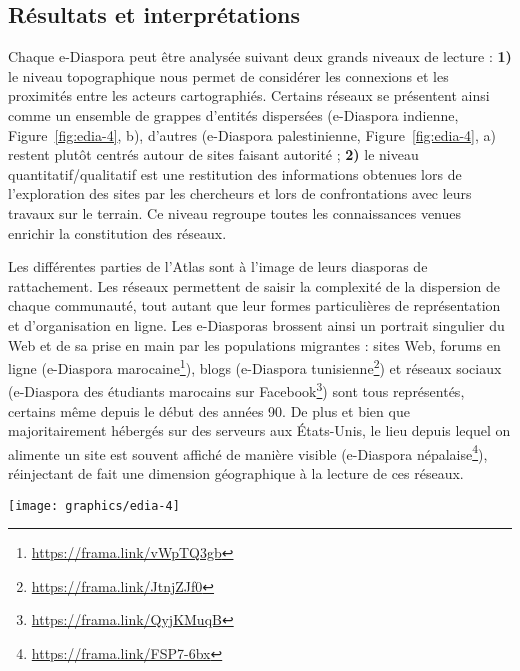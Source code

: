 \documentclass[symmetric,justified,marginals=raggedouter]{tufte-book}
\begin{document}
\subsection{Résultats et interprétations}

\noindent Chaque e-Diaspora peut être analysée suivant deux grands niveaux de lecture : \textbf{1)} le niveau topographique nous permet de considérer les connexions et les proximités entre les acteurs cartographiés. Certains réseaux se présentent ainsi comme un ensemble de grappes d'entités dispersées (e-Diaspora indienne, Figure~\ref{fig:edia-4}, b), d'autres (e-Diaspora palestinienne, Figure~\ref{fig:edia-4}, a) restent plutôt centrés autour de sites faisant autorité \citep{ben-david_palestinian_2012}; \textbf{2)} le niveau quantitatif/qualitatif est une restitution des informations obtenues lors de l'exploration des sites par les chercheurs et lors de confrontations avec leurs travaux sur le terrain. Ce niveau regroupe toutes les connaissances venues enrichir la constitution des réseaux.

Les différentes parties de l'Atlas sont à l'image de leurs diasporas de rattachement. Les réseaux permettent de saisir la complexité de la dispersion de chaque communauté, tout autant que leur formes particulières de représentation et d'organisation en ligne. Les e-Diasporas brossent ainsi un portrait singulier du Web et de sa prise en main par les populations migrantes : sites Web, forums en ligne (e-Diaspora marocaine\footnote{\RaggedOuter \url{https://frama.link/vWpTQ3gb}}), blogs (e-Diaspora tunisienne\footnote{\RaggedOuter \url{https://frama.link/JtnjZJf0}}) et réseaux sociaux (e-Diaspora des étudiants marocains sur Facebook\footnote{\RaggedOuter \url{https://frama.link/QyjKMuqB}}) sont tous représentés, certains même depuis le début des années 90. De plus et bien que majoritairement hébergés sur des serveurs aux États-Unis, le lieu depuis lequel on alimente un site est souvent affiché de manière visible (e-Diaspora népalaise\footnote{\RaggedOuter \url{https://frama.link/FSP7-6bx}}), réinjectant de fait une dimension géographique à la lecture de ces réseaux.

\begin{figure*}
  \texttt{[image: graphics/edia-4]}
  \caption{L'e-Diaspora palestinienne (a, par A. Ben-David) et l'e-Diaspora indienne (b, par E. Leclerc)}
  \label{fig:edia-4}
\end{figure*}
\end{document}
